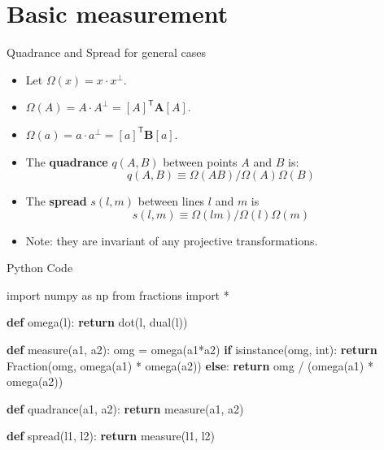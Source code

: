 \documentclass[10pt,ignorenonframetext,serif,onlymath]{beamer}
\newenvironment{Shaded}{}{}
\newcommand{\BuiltInTok}[1]{#1}
\newcommand{\ControlFlowTok}[1]{\textcolor[rgb]{0.00,0.44,0.13}{\textbf{#1}}}
\newcommand{\ImportTok}[1]{#1}
\newcommand{\KeywordTok}[1]{\textcolor[rgb]{0.00,0.44,0.13}{\textbf{#1}}}
\newcommand{\NormalTok}[1]{#1}
\newcommand{\OperatorTok}[1]{\textcolor[rgb]{0.40,0.40,0.40}{#1}}
\begin{document}
\hypertarget{sec:basic-measurement}{%
\section{Basic measurement}\label{sec:basic-measurement}}

\begin{frame}{Quadrance and Spread for general cases}
\protect\hypertarget{sec:quadrance-and-spread-for-general-cases}{}

\begin{itemize}
\item
  Let \(\Omega(x) = x \cdot x^\perp\).
\item
  \(\Omega(A) = A \cdot A^\perp = [A]^\mathsf{T} \mathbf{A} [A]\).
\item
  \(\Omega(a) = a \cdot a^\perp = [a]^\mathsf{T} \mathbf{B} [a]\).
\item
  The \textbf{quadrance} \(q(A, B)\) between points \(A\) and \(B\) is:
  \[q(A, B) \equiv \Omega(AB) / \Omega(A) \Omega(B)\]
\item
  The \textbf{spread} \(s(l, m)\) between lines \(l\) and \(m\) is
  \[s(l, m) \equiv  \Omega(lm) / \Omega(l) \Omega(m)\]
\item
  Note: they are invariant of any projective transformations.
\end{itemize}

\end{frame}

\begin{frame}[fragile]{Python Code}
\protect\hypertarget{sec:python-code-1}{}

\scriptsize

\begin{Shaded}
\begin{Highlighting}[]
\ImportTok{import}\NormalTok{ numpy }\ImportTok{as}\NormalTok{ np}
\ImportTok{from}\NormalTok{ fractions }\ImportTok{import} \OperatorTok{*}

\KeywordTok{def}\NormalTok{ omega(l):}
    \ControlFlowTok{return}\NormalTok{ dot(l, dual(l))}

\KeywordTok{def}\NormalTok{ measure(a1, a2):}
\NormalTok{    omg }\OperatorTok{=}\NormalTok{ omega(a1}\OperatorTok{*}\NormalTok{a2)}
    \ControlFlowTok{if} \BuiltInTok{isinstance}\NormalTok{(omg, }\BuiltInTok{int}\NormalTok{):}
        \ControlFlowTok{return}\NormalTok{ Fraction(omg, omega(a1) }\OperatorTok{*}\NormalTok{ omega(a2))}
    \ControlFlowTok{else}\NormalTok{:}
        \ControlFlowTok{return}\NormalTok{ omg }\OperatorTok{/}\NormalTok{ (omega(a1) }\OperatorTok{*}\NormalTok{ omega(a2))}

\KeywordTok{def}\NormalTok{ quadrance(a1, a2):}
    \ControlFlowTok{return}\NormalTok{ measure(a1, a2)}

\KeywordTok{def}\NormalTok{ spread(l1, l2):}
    \ControlFlowTok{return}\NormalTok{ measure(l1, l2)}
\end{Highlighting}
\end{Shaded}

\end{frame}
\end{document}
